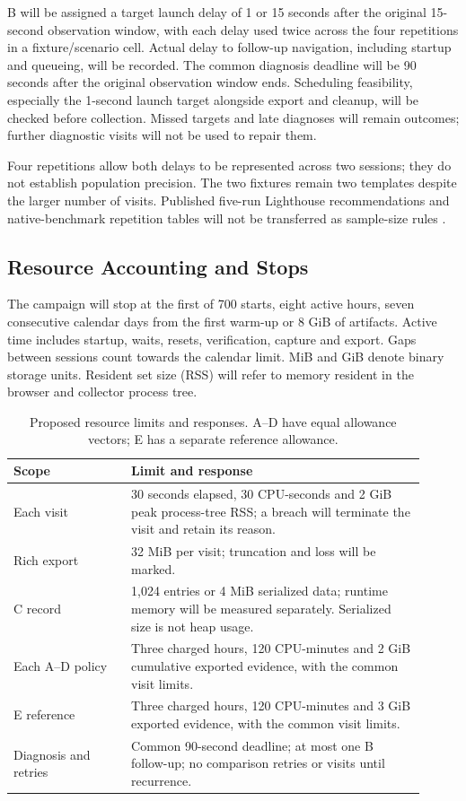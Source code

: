 B will be assigned a target launch delay of 1 or 15 seconds after the original 15-second observation window, with each delay used twice across the four repetitions in a fixture/scenario cell. Actual delay to follow-up navigation, including startup and queueing, will be recorded. The common diagnosis deadline will be 90 seconds after the original observation window ends. Scheduling feasibility, especially the 1-second launch target alongside export and cleanup, will be checked before collection. Missed targets and late diagnoses will remain outcomes; further diagnostic visits will not be used to repair them.

Four repetitions allow both delays to be represented across two sessions; they do not establish population precision. The two fixtures remain two templates despite the larger number of visits. Published five-run Lighthouse recommendations and native-benchmark repetition tables will not be transferred as sample-size rules \parencite{DJI5ULJD,GJMALCNF}.

\subsection{Resource Accounting and Stops}

The campaign will stop at the first of 700 starts, eight active hours, seven consecutive calendar days from the first warm-up or 8 GiB of artifacts. Active time includes startup, waits, resets, verification, capture and export. Gaps between sessions count towards the calendar limit. MiB and GiB denote binary storage units. Resident set size (RSS) will refer to memory resident in the browser and collector process tree.

\begin{table}[htbp]
\centering
\caption{Proposed resource limits and responses. A--D have equal allowance vectors; E has a separate reference allowance.}
\label{tab:resource-limits}
\begin{tabular}{p{0.26\linewidth}p{0.65\linewidth}}
\toprule
Scope & Limit and response \\
\midrule
Each visit & 30 seconds elapsed, 30 CPU-seconds and 2 GiB peak process-tree RSS; a breach will terminate the visit and retain its reason. \\
Rich export & 32 MiB per visit; truncation and loss will be marked. \\
C record & 1,024 entries or 4 MiB serialized data; runtime memory will be measured separately. Serialized size is not heap usage. \\
Each A--D policy & Three charged hours, 120 CPU-minutes and 2 GiB cumulative exported evidence, with the common visit limits. \\
E reference & Three charged hours, 120 CPU-minutes and 3 GiB exported evidence, with the common visit limits. \\
Diagnosis and retries & Common 90-second deadline; at most one B follow-up; no comparison retries or visits until recurrence. \\
\bottomrule
\end{tabular}
\end{table}

